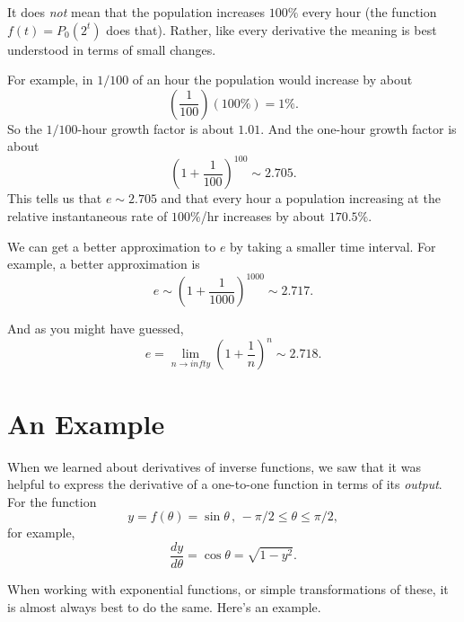 \documentclass{ximera}
\begin{document}
It does \emph{not} mean that the population increases $100\%$ every hour (the function $f(t)=P_0(2^t)$ does that). Rather, like every derivative the meaning is best understood in terms of small changes.

For example, in $1/100$ of an hour the population would increase by about
\[
     \left( \frac{1}{100} \right) (100\%) = 1\%.
\]
So the $1/100$-hour growth factor is about $1.01$. And the one-hour growth factor is about 
\[
  \left( 1 + \frac{1}{100} \right)^{100} \sim 2.705 .
\]
This tells us that $e\sim 2.705$ and that every hour a population increasing at the relative instantaneous rate of $100\%$/hr increases by about $170.5\%$.

We can get a better approximation to $e$ by taking a smaller time interval. For example, a better approximation is 
\[
  e \sim \left( 1 + \frac{1}{1000} \right)^{1000} \sim 2.717 .
\]

And as you might have guessed,
\[
     e = \lim_{n\to infty}\left( 1  + \frac{1}{n} \right)^n \sim 2.718 .
\]


\section{An Example}

When we learned about derivatives of inverse functions, we saw that it was helpful to express the derivative of a one-to-one function in terms of its \emph{output}. For the function
\[
 y = f(\theta) = \sin\theta \, , \, -\pi/2 \leq \theta \leq \pi/2,
\]
for example, 
\[
    \frac{dy}{d\theta} = \cos\theta = \sqrt{1-y^2}.
\]

When working with exponential functions, or simple transformations of these, it is almost always best to do the same. Here's an example.
\end{document}
